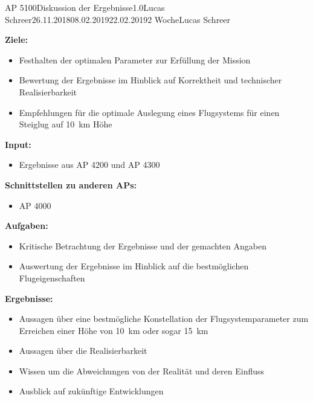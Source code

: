\begin{appendix}
\clearpage
\begin{wpd}{AP 5100}{Diskussion der Ergebnisse}{1.0}{Lucas Schreer}{26.11.2018}{08.02.2019}{22.02.2019}{2 Woche}{Lucas Schreer}
    {
    \textbf{Ziele:}
    \begin{itemize}
        \item Festhalten der optimalen Parameter zur Erfüllung der Mission
        \item Bewertung der Ergebnisse im Hinblick auf Korrektheit und technischer Realisierbarkeit
        \item Empfehlungen für die optimale Auslegung eines Flugsystems für einen Steiglug auf \SI{10}{km} Höhe
    \end{itemize}
    \textbf{Input:}
    \begin{itemize}
        \item Ergebnisse aus AP 4200 und AP 4300
    \end{itemize}
    \textbf{Schnittstellen zu anderen APs:}
    \begin{itemize}
        \item AP 4000
    \end{itemize}
    \textbf{Aufgaben:}
    \begin{itemize}        
        \item Kritische Betrachtung der Ergebnisse und der gemachten Angaben 
        \item Auswertung der Ergebnisse im Hinblick auf die bestmöglichen Flugeigenschaften
    \end{itemize}
    \textbf{Ergebnisse:}
    \begin{itemize}
        \item Aussagen über eine bestmögliche Konstellation der Flugsystemparameter zum Erreichen einer Höhe von \SI{10}{km} oder sogar \SI{15}{km}
        \item Aussagen über die Realisierbarkeit 
        \item Wissen um die Abweichungen von der Realität und deren Einfluss 
        \item Ausblick auf zukünftige Entwicklungen
    \end{itemize}
    }
\end{wpd}



\end{appendix}
